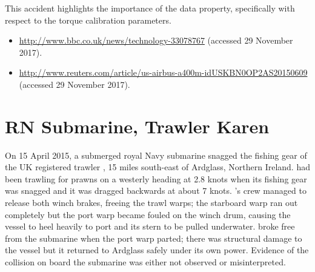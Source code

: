 This accident highlights the importance of the  \gls{data property}, specifically with respect to the torque calibration parameters.

\begin{samepage}
\begin{itemize}
  \item \raggedright{\href{http://www.bbc.co.uk/news/technology-33078767}{http://www.bbc.co.uk/news/technology-33078767} (accessed 29 November 2017).}
  \item \raggedright{\href{http://www.reuters.com/article/us-airbus-a400m-idUSKBN0OP2AS20150609}{http://www.reuters.com/article/us-airbus-a400m-idUSKBN0OP2AS20150609} (accessed 29 November 2017).}
\end{itemize}
\end{samepage}


\section{RN Submarine, Trawler Karen} \label{bkm:incacc:subtrawler}
On 15 April 2015, a submerged royal Navy submarine snagged the fishing gear of the UK registered trawler , 15 miles south-east of Ardglass, Northern Ireland.  had been trawling for prawns on a westerly heading at 2.8 knots when its fishing gear was snagged and it was dragged backwards at about 7 knots. 's crew managed to release both winch brakes, freeing the trawl warps; the starboard warp ran out completely but the port warp became fouled on the winch drum, causing the vessel to heel heavily to port and its stern to be pulled underwater.  broke free from the submarine when the port warp parted; there was structural damage to the vessel but it returned to Ardglass safely under its own power. Evidence of the collision on board the submarine was either not observed or misinterpreted. 

